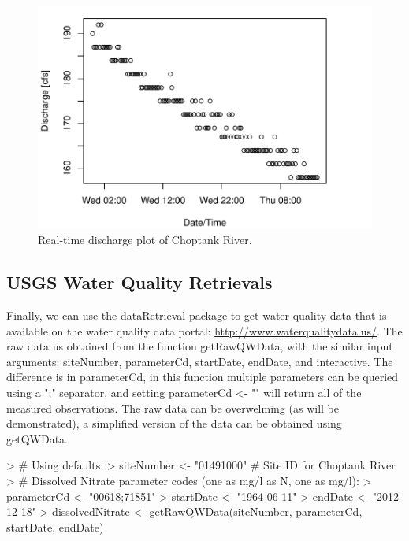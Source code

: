 \documentclass[a4paper,11pt]{article}
\begin{document}
\begin{figure}
\begin{center}
\includegraphics{dataRetrieval-fig2}
\end{center}
\caption{Real-time discharge plot of Choptank River.}
\end{figure}


\subsection{USGS Water Quality Retrievals}
Finally, we can use the dataRetrieval package to get water quality data that is available on the water quality data portal: \url{http://www.waterqualitydata.us/}. The raw data us obtained from the function  getRawQWData, with the similar input arguments: siteNumber, parameterCd, startDate, endDate, and interactive. The difference is in parameterCd, in this function multiple parameters can be queried using a ";" separator, and setting parameterCd <- "" will return all of the measured observations. The raw data can be overwelming (as will be demonstrated), a simplified version of the data can be obtained using getQWData.


\begin{Schunk}
\begin{Sinput}
> # Using defaults:
> siteNumber <- "01491000" # Site ID for Choptank River
> # Dissolved Nitrate parameter codes (one as mg/l as N, one as mg/l):
> parameterCd <- "00618;71851"  
> startDate <- "1964-06-11"
> endDate <- "2012-12-18"
> dissolvedNitrate <- getRawQWData(siteNumber, parameterCd, startDate, endDate)
\end{Sinput}
\end{Schunk}
\end{document}
